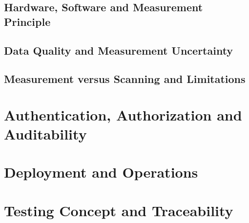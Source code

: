 \subsection{Hardware, Software and Measurement Principle}\label{sec:implementation:camera:hardware}

\subsection{Data Quality and Measurement Uncertainty}\label{sec:implementation:camera:quality}

\subsection{Measurement versus Scanning and Limitations}\label{sec:implementation:camera:limitations}

\section{Authentication, Authorization and Auditability}\label{sec:implementation:auth}

\section{Deployment and Operations}\label{sec:implementation:deployment}

\section{Testing Concept and Traceability}\label{sec:implementation:testing}
